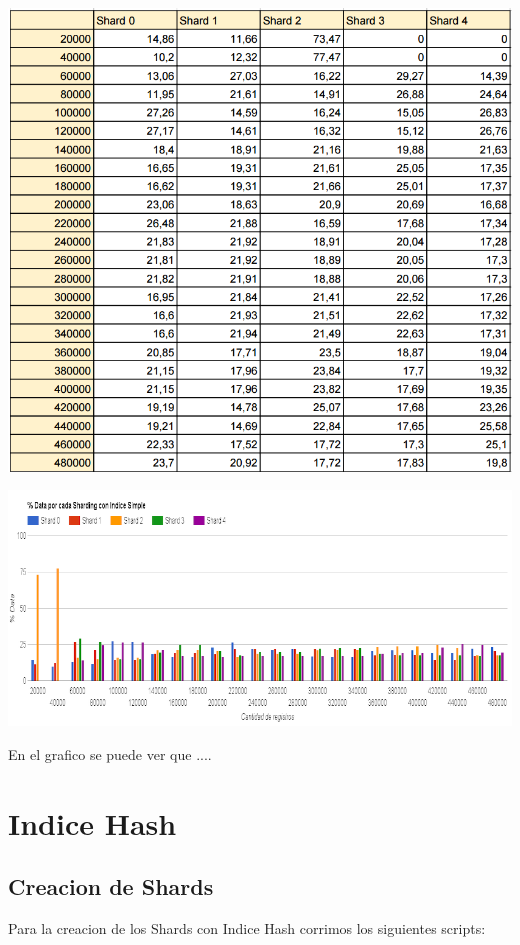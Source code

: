\documentclass[a4paper, 10pt, twoside]{article}
\begin{document}
\begin{center}
\includegraphics[scale=0.8]{resultado_indice_simple.png}
\end{center}
\includegraphics[scale=0.5]{indice_simple.png}

En el grafico se puede ver que ....
\section{Indice Hash}

\subsection{Creacion de Shards}

Para la creacion de los Shards con Indice Hash corrimos los siguientes scripts:
\end{document}

